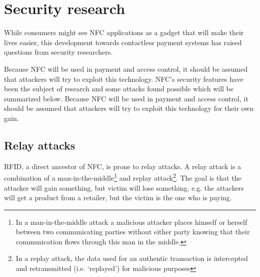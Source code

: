 \section{Security research}

While consumers might see NFC applications as a gadget that will make their lives easier, this development towards contactless payment systems has raised questions from security researchers.

Because NFC will be used in payment and access control, it should be assumed that attackers will try to exploit this technology.
NFC's security features have been the subject of research and some attacks found possible which will be summarized below.
Because NFC will be used in payment and access control, it should be assumed that attackers will try to exploit this technology for their own gain. 


\subsection{Relay attacks}
RFID, a direct ancestor of NFC, is prone to relay attacks.
A relay attack is a combination of a man-in-the-middle\footnote{In a man-in-the-middle attack a malicious attacker places himself or herself between two communicating parties without either party knowing that their communication flows through this man in the middle.} and replay attack\footnote{In a replay attack, the data used for an authentic transaction is intercepted and retransmitted (i.e. `replayed') for malicious purposes}.
The goal is that the attacker will gain something, but victim will lose something, e.g. the attackers will get a product from a retailer, but the victim is the one who is paying. 

